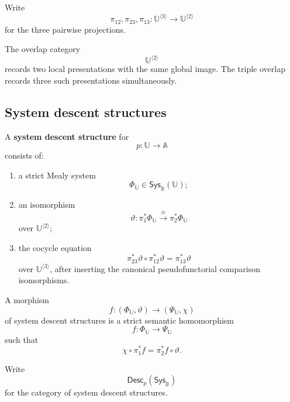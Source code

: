 Write
\[
    \pi_{12},\pi_{23},\pi_{13}:
    \mathbb U^{\langle3\rangle}
    \to
    \mathbb U^{\langle2\rangle}
\]
for the three pairwise projections.

The overlap category
\[
    \mathbb U^{\langle2\rangle}
\]
records two local presentations with the same global image. The triple
overlap records three such presentations simultaneously.

\subsection{System descent structures}
\label{subsec:system-descent-data-rigorous}

\begin{definition}
\label{def:system-descent-datum-rigorous}
A \textbf{system descent structure} for
\[
    p:\mathbb U\to\mathbb A
\]
consists of:
\begin{enumerate}
    \item a strict Mealy system
    \[
        \Phi_{\mathbb U}
        \in
        \mathsf{Sys}_{\mathbb B}(\mathbb U);
    \]
    \item an isomorphism
    \[
        \vartheta:
        \pi_1^\ast\Phi_{\mathbb U}
        \xrightarrow{\cong}
        \pi_2^\ast\Phi_{\mathbb U}
    \]
    over
    \(\mathbb U^{\langle2\rangle}\);
    \item the cocycle equation
    \[
        \pi_{23}^\ast\vartheta
        \circ
        \pi_{12}^\ast\vartheta
        =
        \pi_{13}^\ast\vartheta
    \]
    over
    \(\mathbb U^{\langle3\rangle}\),
    after inserting the canonical pseudofunctorial comparison
    isomorphisms.
\end{enumerate}
\end{definition}

A morphism
\[
    f:
    (\Phi_{\mathbb U},\vartheta)
    \to
    (\Psi_{\mathbb U},\chi)
\]
of system descent structures is a strict semantic homomorphism
\[
    f:\Phi_{\mathbb U}\to\Psi_{\mathbb U}
\]
such that
\[
    \chi\circ\pi_1^\ast f
    =
    \pi_2^\ast f\circ\vartheta.
\]

Write
\[
    \mathsf{Desc}_p
    \left(
        \mathsf{Sys}_{\mathbb B}
    \right)
\]
for the category of system descent structures.

